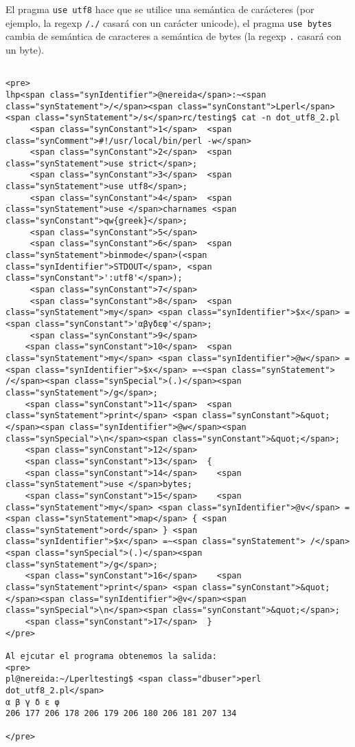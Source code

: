 El pragma \verb|use utf8| hace que se utilice una semántica de
carácteres (por ejemplo, la regexp \verb|/./| casará con un carácter unicode), el
pragma \verb|use bytes| cambia de semántica de caracteres
a semántica de bytes (la regexp \verb/./ casará con un byte).

\begin{verbatim}

<pre>
lhp<span class="synIdentifier">@nereida</span>:~<span class="synStatement">/</span><span class="synConstant">Lperl</span><span class="synStatement">/s</span>rc/testing$ cat -n dot_utf8_2.pl
     <span class="synConstant">1</span>  <span class="synComment">#!/usr/local/bin/perl -w</span>
     <span class="synConstant">2</span>  <span class="synStatement">use strict</span>;
     <span class="synConstant">3</span>  <span class="synStatement">use utf8</span>;
     <span class="synConstant">4</span>  <span class="synStatement">use </span>charnames <span class="synConstant">qw{greek}</span>;
     <span class="synConstant">5</span>
     <span class="synConstant">6</span>  <span class="synStatement">binmode</span>(<span class="synIdentifier">STDOUT</span>, <span class="synConstant">':utf8'</span>);
     <span class="synConstant">7</span>
     <span class="synConstant">8</span>  <span class="synStatement">my</span> <span class="synIdentifier">$x</span> = <span class="synConstant">'αβγδεφ'</span>;
     <span class="synConstant">9</span>
    <span class="synConstant">10</span>  <span class="synStatement">my</span> <span class="synIdentifier">@w</span> = <span class="synIdentifier">$x</span> =~<span class="synStatement"> /</span><span class="synSpecial">(.)</span><span class="synStatement">/g</span>;
    <span class="synConstant">11</span>  <span class="synStatement">print</span> <span class="synConstant">&quot;</span><span class="synIdentifier">@w</span><span class="synSpecial">\n</span><span class="synConstant">&quot;</span>;
    <span class="synConstant">12</span>
    <span class="synConstant">13</span>  {
    <span class="synConstant">14</span>    <span class="synStatement">use </span>bytes;
    <span class="synConstant">15</span>    <span class="synStatement">my</span> <span class="synIdentifier">@v</span> = <span class="synStatement">map</span> { <span class="synStatement">ord</span> } <span class="synIdentifier">$x</span> =~<span class="synStatement"> /</span><span class="synSpecial">(.)</span><span class="synStatement">/g</span>;
    <span class="synConstant">16</span>    <span class="synStatement">print</span> <span class="synConstant">&quot;</span><span class="synIdentifier">@v</span><span class="synSpecial">\n</span><span class="synConstant">&quot;</span>;
    <span class="synConstant">17</span>  }
</pre>

Al ejcutar el programa obtenemos la salida:
<pre>
pl@nereida:~/Lperltesting$ <span class="dbuser">perl dot_utf8_2.pl</span>
α β γ δ ε φ
206 177 206 178 206 179 206 180 206 181 207 134

</pre>
\end{verbatim}


